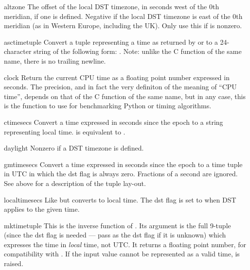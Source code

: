 \begin{datadesc}{altzone}
The offset of the local DST timezone, in seconds west of the 0th
meridian, if one is defined.  Negative if the local DST timezone is
east of the 0th meridian (as in Western Europe, including the UK).
Only use this if  is nonzero.
\end{datadesc}

\begin{funcdesc}{asctime}{tuple}
Convert a tuple representing a time as returned by 
or  to a 24-character string of the following form:
.  Note: unlike the C function of
the same name, there is no trailing newline.
\end{funcdesc}

\begin{funcdesc}{clock}{}
Return the current CPU time as a floating point number expressed in
seconds.  The precision, and in fact the very definiton of the meaning
of ``CPU time'', depends on that of the C function
of the same name, but in any case, this is the function to use for
benchmarking Python or timing algorithms.
\end{funcdesc}

\begin{funcdesc}{ctime}{secs}
Convert a time expressed in seconds since the epoch to a string
representing local time.   is equivalent to
.
\end{funcdesc}

\begin{datadesc}{daylight}
Nonzero if a DST timezone is defined.
\end{datadesc}

\begin{funcdesc}{gmtime}{secs}
Convert a time expressed in seconds since the epoch to a time tuple
in UTC in which the dst flag is always zero.  Fractions of a second are
ignored.  See above for a description of the tuple lay-out.
\end{funcdesc}

\begin{funcdesc}{localtime}{secs}
Like  but converts to local time.  The dst flag is
set to  when DST applies to the given time.
\end{funcdesc}

\begin{funcdesc}{mktime}{tuple}
This is the inverse function of .  Its argument
is the full 9-tuple (since the dst flag is needed --- pass 
as the dst flag if it is unknown) which expresses the time in
\emph{local} time, not UTC.  It returns a floating point number, for
compatibility with .  If the input value cannot be
represented as a valid time,  is raised.
\end{funcdesc}

